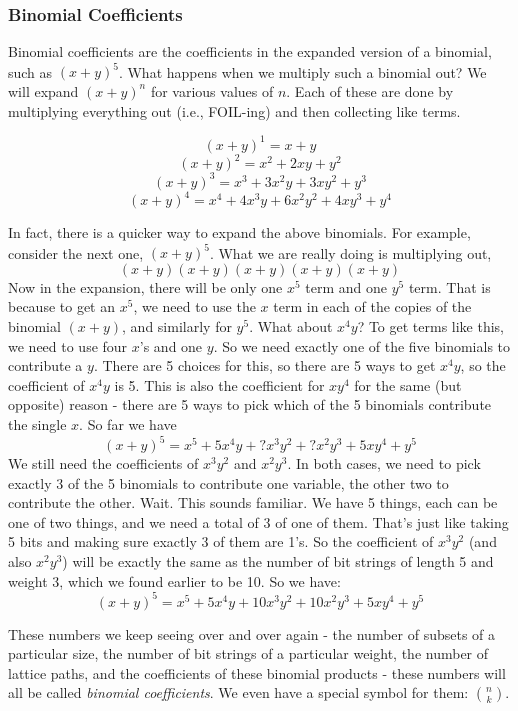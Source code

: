 \documentclass[12pt]{article}
\begin{document}
\subsubsection*{Binomial Coefficients}

Binomial coefficients are the coefficients in the expanded version of a binomial, such as $(x+y)^5$.  What happens when we multiply such a binomial out?  We will expand $(x+y)^n$ for various values of $n$.  Each of these are done by multiplying everything out (i.e., FOIL-ing) and then collecting like terms.

\[(x+y)^1 = x + y\]
\[(x+y)^2 = x^2 + 2xy + y^2\]
\[(x+y)^3 = x^3 + 3x^2y + 3xy^2 + y^3\]
\[(x+y)^4 = x^4 + 4x^3y + 6x^2y^2 + 4xy^3 + y^4\]

In fact, there is a quicker way to expand the above binomials.  For example, consider the next one, $(x+y)^5$.  What we are really doing is multiplying out,
\[(x+y)(x+y)(x+y)(x+y)(x+y)\]
Now in the expansion, there will be only one $x^5$ term and one $y^5$ term.  That is because to get an $x^5$, we need to use the $x$ term in each of the copies of the binomial $(x+y)$, and similarly for $y^5$.  What about $x^4y$?  To get terms like this, we need to use four $x$'s and one $y$.  So we need exactly one of the five binomials to contribute a $y$.  There are 5 choices for this, so there are 5 ways to get $x^4y$, so the coefficient of $x^4y$ is 5.  This is also the coefficient for $xy^4$ for the same (but opposite) reason - there are 5 ways to pick which of the 5 binomials contribute the single $x$.  So far we have
\[(x+y)^5 = x^5 + 5x^4y + ?x^3y^2 + ?x^2y^3 + 5 xy^4 + y^5\]
We still need the coefficients of $x^3y^2$ and $x^2y^3$.  In both cases, we need to pick exactly 3 of the 5 binomials to contribute one variable, the other two to contribute the other.  Wait.  This sounds familiar.   We have 5 things, each can be one of two things, and we need a total of 3 of one of them.  That's just like taking 5 bits and making sure exactly 3 of them are 1's.  So the coefficient of $x^3y^2$ (and also $x^2y^3$) will be exactly the same as the number of bit strings of length 5 and weight 3, which we found earlier to be 10.  So we have:
\[(x+y)^5 = x^5 + 5x^4y + 10x^3y^2 + 10x^2y^3 + 5 xy^4 + y^5\]

These numbers we keep seeing over and over again - the number of subsets of a particular size, the number of bit strings of a particular weight, the number of lattice paths, and the coefficients of these binomial products - these numbers will all be called {\em binomial coefficients}.  We even have a special symbol for them: ${n \choose k}$.
\end{document}
